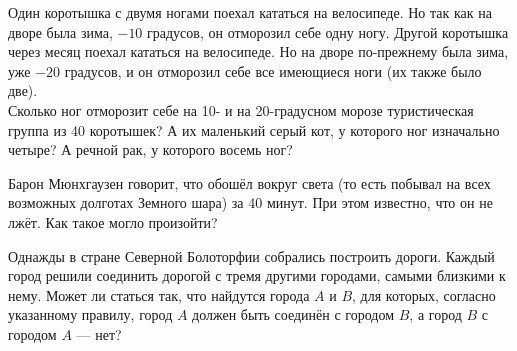 ﻿
\begin{enumerate}
\itA Один коротышка с двумя ногами поехал кататься на велосипеде. Но так как на дворе была зима, $-10$ градусов, он отморозил себе одну ногу. Другой коротышка через месяц поехал кататься на велосипеде. Но на дворе по-прежнему была зима, уже $-20$ градусов, и он отморозил себе все имеющиеся ноги (их также было две). \smallskip \\
Сколько ног отморозит себе на 10- и на 20-градусном морозе туристическая группа из 40 коротышек? А их маленький серый кот, у которого ног изначально четыре? А речной рак, у которого восемь ног?

\itB Барон Мюнхгаузен говорит, что обошёл вокруг света (то есть побывал на всех возможных долготах Земного шара) за 40 минут. При этом известно, что он не лжёт. Как такое могло произойти?

\itC Однажды в стране Северной Болоторфии собрались построить дороги. Каждый город решили соединить дорогой с тремя другими городами, самыми близкими к нему. Может ли статься так, что найдутся города $A$ и $B$, для которых, согласно указанному правилу, город $A$ должен быть соединён с городом $B$, а город $B$ с городом $A$ — нет?
\end{enumerate}